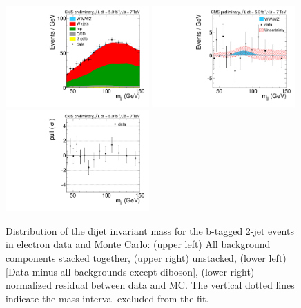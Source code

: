 \begin{figure}[h!]
  {\centering
    \includegraphics[width=0.49\textwidth]{figs/mjjfit_2jetsample/Wjj_Diboson_btag_Electron_2jets_Stacked.pdf}
    \includegraphics[width=0.49\textwidth]{figs/mjjfit_2jetsample/Wjj_Diboson_btag_Electron_2jets_Subtracted.pdf}
    \includegraphics[width=0.49\textwidth]{figs/mjjfit_2jetsample/Wjj_Diboson_btag_Electron_2jets_Pull.pdf}
    \caption{Distribution of the dijet invariant mass for the b-tagged 2-jet events in electron data and Monte Carlo: 
      (upper left) All background components stacked together, 
      (upper right) unstacked, (lower left) [Data minus all backgrounds except diboson],  
      (lower right) normalized residual between data and MC. The vertical dotted lines
      indicate the mass interval excluded from the fit.}
    \label{fig:mjj_2jet_el_btag}}
\end{figure}
